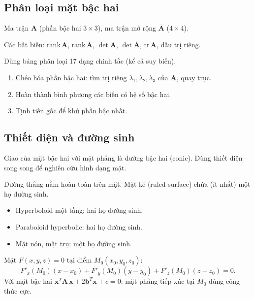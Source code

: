 \documentclass[12pt,a4paper]{article}
\begin{document}
\subsection{Phân loại mặt bậc hai}

\begin{phuongphap}[title={Phân loại bằng bất biến}]
  Ma trận $\mathbf{A}$ (phần bậc hai $3 \times 3$), ma trận mở rộng $\bar{\mathbf{A}}$ ($4 \times 4$).

  Các bất biến: $\text{rank}\,\mathbf{A}$, $\text{rank}\,\bar{\mathbf{A}}$, $\det\mathbf{A}$, $\det\bar{\mathbf{A}}$, $\text{tr}\,\mathbf{A}$, dấu trị riêng.

  Dùng bảng phân loại 17 dạng chính tắc (kể cả suy biến).
\end{phuongphap}

\begin{phuongphap}[title={Đưa về dạng chính tắc}]
  \begin{enumerate}
    \item Chéo hóa phần bậc hai: tìm trị riêng $\lambda_1, \lambda_2, \lambda_3$ của $\mathbf{A}$, quay trục.
    \item Hoàn thành bình phương các biến có hệ số bậc hai.
    \item Tịnh tiến gốc để khử phần bậc nhất.
  \end{enumerate}
\end{phuongphap}

\subsection{Thiết diện và đường sinh}

\begin{dinhnghia}[title={Thiết diện}]
  Giao của mặt bậc hai với mặt phẳng là đường bậc hai (conic). Dùng thiết diện song song để nghiên cứu hình dạng mặt.
\end{dinhnghia}

\begin{dinhnghia}[title={Đường sinh (ruling)}]
  Đường thẳng nằm hoàn toàn trên mặt. Mặt kẻ (ruled surface) chứa (ít nhất) một họ đường sinh.
  \begin{itemize}
    \item Hyperboloid một tầng: hai họ đường sinh.
    \item Paraboloid hyperbolic: hai họ đường sinh.
    \item Mặt nón, mặt trụ: một họ đường sinh.
  \end{itemize}
\end{dinhnghia}

\begin{phuongphap}[title={Mặt phẳng tiếp xúc}]
  Mặt $F(x, y, z) = 0$ tại điểm $M_0(x_0, y_0, z_0)$:
  \[
    F'_x(M_0)(x - x_0) + F'_y(M_0)(y - y_0) + F'_z(M_0)(z - z_0) = 0.
  \]
  Với mặt bậc hai $\mathbf{x}^T \mathbf{A}\, \mathbf{x} + 2\mathbf{b}^T \mathbf{x} + c = 0$: mặt phẳng tiếp xúc tại $M_0$ dùng công thức cực.
\end{phuongphap}
\end{document}
